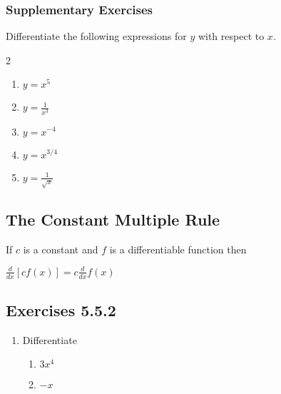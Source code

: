 \subsubsection{Supplementary Exercises}
Differentiate the following expressions for $y$ with respect to $x$.  
\columnsep =30pt
\begin {multicols}{2}
 


\begin{enumerate}
\item $y =x^{5}$ 

\item $y =\frac{1}{x^{3}}$ 

\item $y =x^{ -4}$ 

\item $y =x^{3/4}$ 

\item $y =\frac{1}{\sqrt{x}}$ \end{enumerate}



\end {multicols}


\subsection{The Constant Multiple Rule}
If $c$ is a constant and $f$ is a differentiable function then 


\begin{center}
$\frac{d}{d x} \left [c f (x)\right ] =c \frac{d}{d x} f (x)$
\end{center}\par


\subsection{Exercises 5.5.2}
\begin{enumerate}
\item Differentiate 


\begin{enumerate}
\item $3 x^{4}$ 

\item $ -x$ \end{enumerate}
\end{enumerate}


